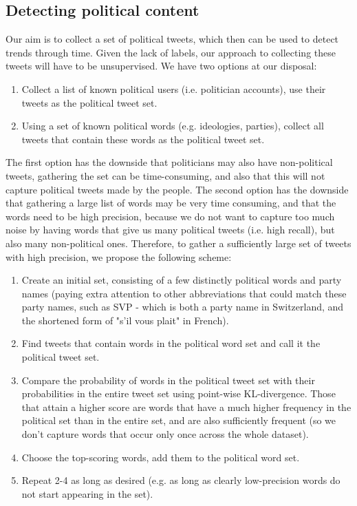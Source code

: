 \subsection{Detecting political content}

Our aim is to collect a set of political tweets, which then can be used to detect trends through time. Given the lack of labels, our approach to collecting these tweets will have to be unsupervised. We have two options at our disposal:
\begin{enumerate}
  \item Collect a list of known political users (i.e. politician accounts), use their tweets as the political tweet set.
  \item Using a set of known political words (e.g. ideologies, parties), collect all tweets that contain these words as the political tweet set.
\end{enumerate}
The first option has the downside that politicians may also have non-political tweets, gathering the set can be time-consuming, and also that this will not capture political tweets made by the people. The second option has the downside that gathering a large list of words may be very time consuming, and that the words need to be high precision, because we do not 
want to capture too much noise by having words that give us many political tweets (i.e. high recall), but also many non-political ones. Therefore, to gather a sufficiently large set of tweets with high precision, we propose the following scheme:
\begin{enumerate}
  \item Create an initial set, consisting of a few distinctly political words and party names (paying extra attention to other abbreviations that could match these party names, such as SVP - which is both a party name in Switzerland, and the shortened form of "s'il vous plait" in French).
  \item Find tweets that contain words in the political word set and call it the political tweet set.
  \item Compare the probability of words in the political tweet set with their probabilities in the entire tweet set using point-wise KL-divergence. Those that attain a higher score are words that have a much higher frequency in the political set than in the entire set, and are also sufficiently frequent (so we don't capture words that occur only once across the whole dataset).
  \item Choose the top-scoring words, add them to the political word set.
  \item Repeat 2-4 as long as desired (e.g. as long as clearly low-precision words do not start appearing in the set).
\end{enumerate}
